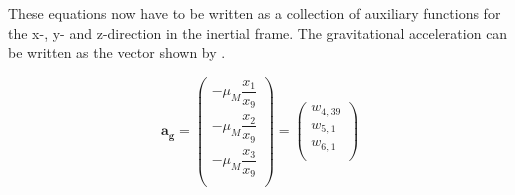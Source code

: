 %
%

These equations now have to be written as a collection of auxiliary functions for the x-, y- and z-direction in the inertial frame. The gravitational acceleration can be written as the vector shown by .

\begin{equation} \label{eq:gravAuxF}
\mathbf{a_{g}} =
\begin{pmatrix}
-\mu_{M}\dfrac{x_{1}}{x_{9}} \\
-\mu_{M}\dfrac{x_{2}}{x_{9}} \\
-\mu_{M}\dfrac{x_{3}}{x_{9}} \\
\end{pmatrix}
= 
\begin{pmatrix}
w_{4,39} \\
w_{5,1} \\
w_{6,1} \\
\end{pmatrix}
\end{equation}

